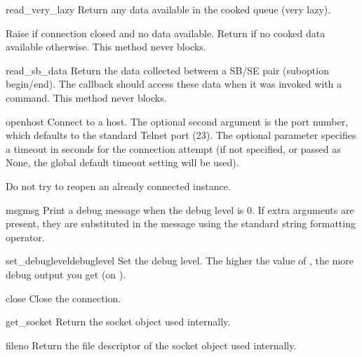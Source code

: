 \begin{methoddesc}[Telnet]{read_very_lazy}{}
Return any data available in the cooked queue (very lazy).

Raise  if connection closed and no data available.
Return  if no cooked data available otherwise.  This method
never blocks.
\end{methoddesc}

\begin{methoddesc}[Telnet]{read_sb_data}{}
Return the data collected between a SB/SE pair (suboption begin/end).
The callback should access these data when it was invoked with a
 command. This method never blocks.

\end{methoddesc}

\begin{methoddesc}[Telnet]{open}{host}
Connect to a host.
The optional second argument is the port number, which
defaults to the standard Telnet port (23).
The optional  parameter specifies a timeout in seconds for the
connection attempt (if not specified, or passed as None, the global default
timeout setting will be used).

Do not try to reopen an already connected instance.
\end{methoddesc}

\begin{methoddesc}[Telnet]{msg}{msg}
Print a debug message when the debug level is \code{>} 0.
If extra arguments are present, they are substituted in the
message using the standard string formatting operator.
\end{methoddesc}

\begin{methoddesc}[Telnet]{set_debuglevel}{debuglevel}
Set the debug level.  The higher the value of , the
more debug output you get (on ).
\end{methoddesc}

\begin{methoddesc}[Telnet]{close}{}
Close the connection.
\end{methoddesc}

\begin{methoddesc}[Telnet]{get_socket}{}
Return the socket object used internally.
\end{methoddesc}

\begin{methoddesc}[Telnet]{fileno}{}
Return the file descriptor of the socket object used internally.
\end{methoddesc}

